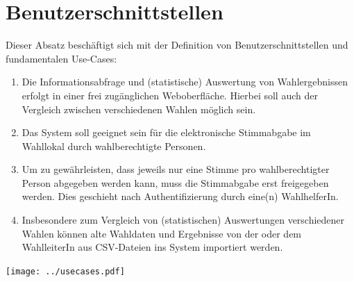 \documentclass[a4paper,12pt]{article}
\begin{document}
\section{Benutzerschnittstellen}
Dieser Absatz beschäftigt sich mit der Definition von Benutzerschnittstellen und fundamentalen Use-Cases:

\begin{enumerate}
  \item Die Informationsabfrage und (statistische) Auswertung von Wahlergebnissen erfolgt
        in einer frei zugänglichen Weboberfläche. Hierbei soll auch der Vergleich zwischen 
        verschiedenen Wahlen möglich sein. 
  \item Das System soll geeignet sein für die elektronische Stimmabgabe im Wahllokal durch
        wahlberechtigte Personen.
  \item Um zu gewährleisten, dass jeweils nur eine Stimme pro wahlberechtigter Person abgegeben
        werden kann, muss die Stimmabgabe erst freigegeben werden. Dies geschieht nach
        Authentifizierung durch eine(n) WahlhelferIn.
  \item Insbesondere zum Vergleich von (statistischen) Auswertungen verschiedener Wahlen können
        alte Wahldaten und Ergebnisse von der oder dem WahlleiterIn aus CSV-Dateien ins System 
        importiert werden.
\end{enumerate}

\begin{center}
	\texttt{[image: ../usecases.pdf]}
\end{center}
\end{document}
